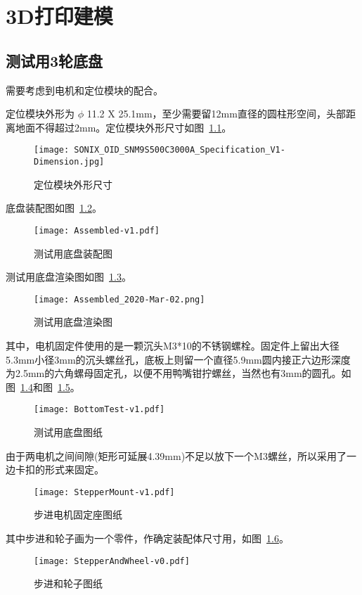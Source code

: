 \chapter{3D打印建模}
\label{cha:Model}

\section{测试用3轮底盘}

需要考虑到电机和定位模块的配合。

定位模块外形为 $\phi$ 11.2 X 25.1mm，至少需要留12mm直径的圆柱形空间，头部距离地面不得超过2mm。定位模块外形尺寸如图~\ref{fig:Camera-Dimension}。

\begin{figure}[htbp]
    \centering
    \texttt{[image: SONIX\_OID\_SNM9S500C3000A\_Specification\_V1-Dimension.jpg]}
    \caption{定位模块外形尺寸}
    \label{fig:Camera-Dimension}
\end{figure}

底盘装配图如图~\ref{fig:Assembled-Test-Datasheet}。

\begin{figure}[htbp]
    \centering
    \texttt{[image: Assembled-v1.pdf]}
    \caption{测试用底盘装配图}
    \label{fig:Assembled-Test-Datasheet}
\end{figure}

测试用底盘渲染图如图~\ref{fig:Assembled-Test-Render}。

\begin{figure}[htbp]
    \centering
    \texttt{[image: Assembled\_2020-Mar-02.png]}
    \caption{测试用底盘渲染图}
    \label{fig:Assembled-Test-Render}
\end{figure}

其中，电机固定件使用的是一颗沉头M3*10的不锈钢螺栓。固定件上留出大径5.3mm小径3mm的沉头螺丝孔，底板上则留一个直径5.9mm圆内接正六边形深度为2.5mm的六角螺母固定孔，以便不用鸭嘴钳拧螺丝，当然也有3mm的圆孔。如图~\ref{fig:BottomTest-v1-Datasheet}和图~\ref{fig:StepperMount-v1-Datasheet}。

\begin{figure}[htbp]
    \centering
    \texttt{[image: BottomTest-v1.pdf]}
    \caption{测试用底盘图纸}
    \label{fig:BottomTest-v1-Datasheet}
\end{figure}

由于两电机之间间隙(矩形可延展4.39mm)不足以放下一个M3螺丝，所以采用了一边卡扣的形式来固定。

\begin{figure}[htbp]
    \centering
    \texttt{[image: StepperMount-v1.pdf]}
    \caption{步进电机固定座图纸}
    \label{fig:StepperMount-v1-Datasheet}
\end{figure}

其中步进和轮子画为一个零件，作确定装配体尺寸用，如图~\ref{fig:StepperAndWheel-v0-Datasheet}。

\begin{figure}[htbp]
    \centering
    \texttt{[image: StepperAndWheel-v0.pdf]}
    \caption{步进和轮子图纸}
    \label{fig:StepperAndWheel-v0-Datasheet}
\end{figure}
